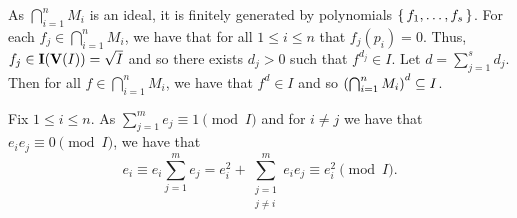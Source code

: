 \documentclass[letterpaper, 11pt, oneside]{book}
\begin{document}
\begin{sol}\label{ex:UAG_4.2.7}
  As $\bigcap_{i = 1}^{n} M_{i}$ is an ideal, it is finitely generated by polynomials $\set{f_{1}, \ldots, f_{s}}$.
  For each $f_{j} \in \bigcap_{i = 1}^{n} M_{i}$, we have that for all $1 \leq i \leq n$ that $f_{j}(p_{i}) = 0$.
  Thus, $f_{j} \in \operatorname{\mathbf{I}}(\operatorname{\mathbf{V}}(I)) = \sqrt{I}$ and so there exists $d_{j} > 0$ such that $f^{d_{j}} \in I$.
  Let $d = \sum_{j = 1}^{s} d_{j}$.
  Then for all $f \in \bigcap_{i = 1}^{n} M_{i}$, we have that $f^{d} \in I$ and so $\pqty{\bigcap_{i = 1}^{n} M_{i}}^{d} \subseteq I$.
\end{sol}

\begin{sol}\label{ex:UAG_4.2.9}
  Fix $1 \leq i \leq n$.
  As $\sum_{j = 1}^{m} e_{j} \equiv 1 \pmod{I}$ and for $i \neq j$ we have that $e_{i}e_{j} \equiv 0 \pmod{I}$, we have that
  \[
    e_{i} \equiv e_{i} \sum_{j = 1}^{m} e_{j} = e_{i}^{2} + \sum_{\substack{j = 1 \\ j \neq i}}^{m} e_{i}e_{j} \equiv e_{i}^{2} \pmod{I}.
  \]
\end{sol}

\clearpage
\end{document}
